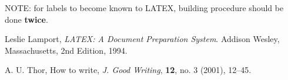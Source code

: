 \documentclass{article}
\begin{document}
NOTE: for labels to become known to LATEX, building procedure should be done \textbf{twice}.

\begin{thebibliography}{9} %


	  Leslie Lamport,  \emph{LATEX: A Document Preparation System}. 	  Addison Wesley, Massachusetts, 	  2nd Edition, 	  1994.

A. U. Thor, How to write, \emph{J. Good Writing}, \textbf{12}, no. 3 (2001), 12--45.

\end{thebibliography} %
\end{document}

